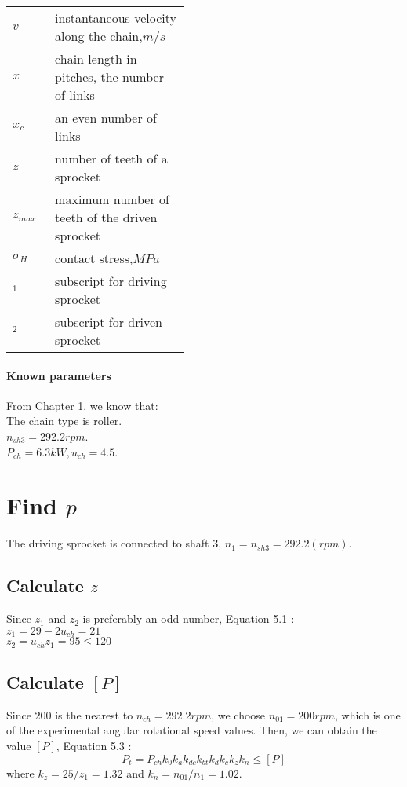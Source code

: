 \begin{tabular}[t]{p{0.05\linewidth}p{0.4\linewidth}}
	$ v $ & instantaneous velocity along the chain,$ \unit{m/s} $\\
	$ x $ & chain length in pitches, the number of links\\
	$ x_c $ & an even number of links\\
	$ z $ & number of teeth of a sprocket\\
	$ z_{max} $ & maximum number of teeth of the driven sprocket\\
	$ \sigma_H $ & contact stress,$ \unit{MPa} $\\
	$ _1 $  & subscript for driving sprocket\\
	$ _2 $  & subscript for driven sprocket\\
\end{tabular}
\paragraph{Known parameters} From Chapter 1, we know that:\\
The chain type is roller.\\
$ n_{sh3}= 292.2\unit{rpm}$.\\
$ P_{ch}=6.3\unit{kW}, u_{ch}=4.5 $.

\section{Find $ p $}
The driving sprocket is connected to shaft 3, $ n_1 = n_{sh3} = 292.2\unit{(rpm)} $.
\subsection{Calculate $ z $}
Since $ z_1 $ and $ z_2 $ is preferably an odd number, Equation 5.1 \cite{tk1}:\\
$ z_1 = 29 - 2u_{ch} = 21 $\\
$ z_2 = u_{ch}z_1 = 95 \leq 120$
\subsection{Calculate $ [P] $}
Since $ 200 $ is the nearest to $ n_{ch} = 292.2 \unit{rpm}$, we choose $ n_{01} = 200\unit{rpm} $, which is one of the experimental angular rotational speed values. Then, we can obtain the value $ [P] $, Equation 5.3 \cite{tk1}:
\[P_t=P_{ch}k_0k_ak_{dc}k_{bt}k_dk_ck_zk_n\leq[P]\]
where $ k_z = {25}/{z_1} = 1.32$ and $ k_n = {n_{01}}/{n_{1}} = 1.02$.

